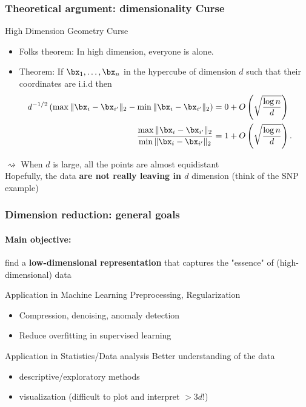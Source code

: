 \documentclass{beamer}\usepackage[]{graphicx}\usepackage[]{color}
\begin{document}
\begin{frame}
\frametitle{Theoretical argument: dimensionality Curse}

\begin{block}{High Dimension Geometry Curse}
\begin{itemize}
\item Folks theorem: In high dimension, everyone is alone.
\item Theorem: If $\bx_1,\ldots, \bx_n$ in the
hypercube of dimension $d$  such
that their coordinates are i.i.d then
\begin{align*}
\mspace{-20mu} d^{-1/2} \left( \max \|\bx_i-\bx_{i'}\|_2 - \min \|\bx_i-\bx_{i'}\|_2
\right)  &= 0 + O\left(\sqrt{\frac{\log n}{d}}\right)\\
\frac{\max \|\bx_i-\bx_{i'}\|_2}{\min \|\bx_i-\bx_{i'}\|_2} &= 1 +
O\left(\sqrt{\frac{\log n}{d}}\right).
\end{align*}
\end{itemize}
\end{block}

  $\rightsquigarrow$ When $d$ is large, all the points are almost equidistant\\

  Hopefully, the data \alert{\bf are not really leaving in $d$} dimension (think of the SNP example)

\end{frame}

\begin{frame}[label=DimensionReduction]
  \frametitle{Dimension reduction: general goals}

  \paragraph{Main objective:} find a \alert{\bf low-dimensional representation} that captures the "essence" of (high-dimensional) data

  \vfill

  \begin{block}{Application in Machine Learning}
  \alert{Preprocessing, Regularization}
  \begin{itemize}
    \item Compression, denoising,  anomaly detection
    \item Reduce overfitting in supervised learning
  \end{itemize}
  \end{block}

\vfill

  \begin{block}{Application in Statistics/Data analysis}
    \alert{Better understanding of the data}
    \begin{itemize}
      \item descriptive/exploratory methods
      \item visualization (difficult to plot and interpret $> 3d$!)
    \end{itemize}
  \end{block}

\end{frame}
\end{document}
